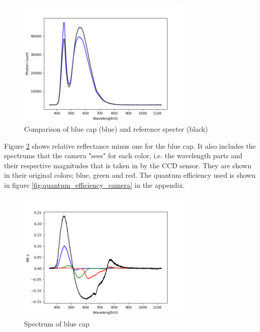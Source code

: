 \begin{figure}[h]
    \centering
    \includegraphics[width=0.75\textwidth]{Plots/blue_cap_original_spectrum_and_background.png}
    \caption{Comparison of blue cap (blue) and reference specter (black)}
    \label{fig:blue_cap_and_reference_spectrum}
\end{figure}


Figure \ref{fig:blue_cap_spectrum} shows relative reflectance minus one for the blue cap. It also includes the spectrums that the camera "sees" for each color, i.e. the wavelength parts and their respective magnitudes that is taken in by the CCD sensor. They are shown in their original colors; blue, green and red. The quantum efficiency used is shown in figure \ref{fig:quantum_efficiency_camera} in the appendix. 

\begin{figure}[h]
    \centering
    \includegraphics[width=0.75\textwidth]{Plots/blue_cap_rr_minus_one_with_qe.png}    
    \caption{Spectrum of blue cap}
    \label{fig:blue_cap_spectrum}
\end{figure}
